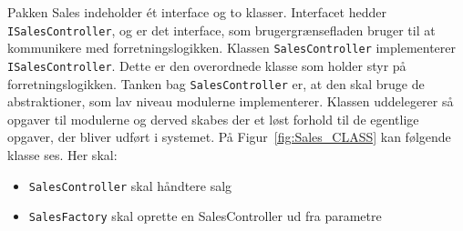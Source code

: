 Pakken Sales indeholder ét interface og to klasser. Interfacet hedder \texttt{ISalesController}, og er det interface, som brugergrænsefladen bruger til at kommunikere med forretningslogikken. Klassen \texttt{SalesController} implementerer \texttt{ISalesController}. Dette er den overordnede klasse som holder styr på forretningslogikken. Tanken bag \texttt{SalesController} er, at den skal bruge de abstraktioner, som lav niveau modulerne implementerer. Klassen uddelegerer så opgaver til modulerne og derved skabes der et løst forhold til de egentlige opgaver, der bliver udført i systemet. 
\newline\newline
På Figur~\ref{fig:Sales_CLASS} kan følgende klasse ses. Her skal:
\begin{itemize}
	\item \texttt{SalesController} skal håndtere salg
	\item \texttt{SalesFactory} skal oprette en SalesController ud fra parametre
\end{itemize}

